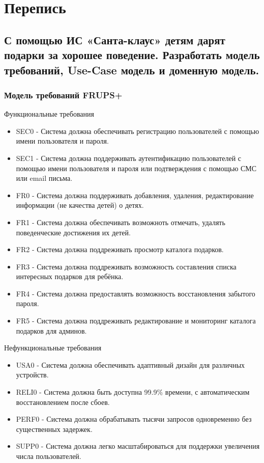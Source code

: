 \documentclass{article}
\begin{document}
\tableofcontents
\newpage

\section[Перепись]{Перепись}
\subsection[Санта-клаус]{С помощью ИС «Санта-клаус» детям дарят подарки за хорошее поведение. Разработать модель требований, Use-Case модель и доменную модель.}
\subsubsection{Модель требований FRUPS+}
Функциональные требования
\begin{itemize}
    \item SEC0 - Система должна обеспечивать регистрацию пользователей с помощью имени пользователя и пароля.
    \item SEC1 - Система должна поддерживать аутентификацию пользователей с помощью имени пользователя и пароля или подтверждения с помощью СМС или email письма.
    \item FR0 - Система должна поддерживать добавления, удаления, редактирование информации (не качества детей) о детях.
    \item FR1 - Система должна обеспечивать возможноть отмечать, удалять поведенческие достижения их детей.
    \item FR2 - Система должна поддреживать просмотр каталога подарков.
    \item FR3 - Система должна поддреживать возможность составления списка интересных подарков для ребёнка.
    \item FR4 - Система должна предоставлять возможность восстановления забытого пароля.
    \item FR5 - Система должна поддреживать редактирование и мониторинг каталога подарков для админов.
\end{itemize}
Нефункциональные требования
\begin{itemize}
    \item USA0 - Система должна обеспечивать адаптивный дизайн для различных устройств.
    \item RELI0 - Система должна быть доступна 99.9\% времени, с автоматическим восстановлением после сбоев.
    \item PERF0 - Система должна обрабатывать тысячи запросов одновременно без существенных задержек.
    \item SUPP0 - Система должна легко масштабироваться для поддержки увеличения числа пользователей.
\end{itemize}
\end{document}
